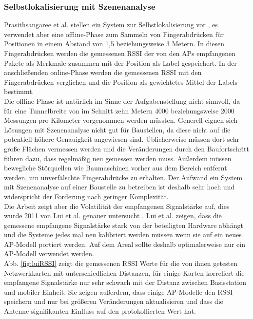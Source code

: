 \subsubsection{Selbstlokalisierung mit Szenenanalyse}
\label{ch:Vorherige:sec:RSS-basierte}
Prasithsangaree et al. stellen ein System zur Selbstlokalisierung vor \cite{prasithsangaree2002indoor}, es verwendet aber eine offline-Phase zum Sammeln von Fingerabdrücken für Positionen in einem Abstand von 1,5 beziehungsweise 3 Metern. 
In diesen Fingerabdrücken werden die gemessenen RSSI der von den APs empfangenen Pakete als Merkmale zusammen mit der Position als Label gespeichert.
In der anschließenden online-Phase werden die gemessenen RSSI mit den Fingerabdrücken verglichen und die Position als gewichtetes Mittel der Labels bestimmt. \\
Die offline-Phase ist natürlich im Sinne der Aufgabenstellung nicht sinnvoll, da für eine Tunnelbreite von im Schnitt zehn Metern 4000 beziehungsweise 2000 Messungen pro Kilometer vorgenommen werden müssten.
Generell eignen sich Lösungen mit Szenenanalyse nicht gut für Baustellen, da diese nicht auf die potentiell höhere Genauigkeit angewiesen sind. 
Üblicherweise müssen dort sehr große Flächen vermessen werden und die Veränderungen durch den Baufortschritt führen dazu, dass regelmäßig neu gemessen werden muss.
Außerdem müssen bewegliche Störquellen wie Baumaschinen vorher aus dem Bereich entfernt werden, um unverfälschte Fingerabdrücke zu erhalten.
Der Aufwand ein System mit Szenenanalyse auf einer Baustelle zu betreiben ist deshalb sehr hoch und widerspricht der Forderung nach geringer Komplexität. \\
Die Arbeit zeigt aber die Volatilität der empfangenen Signalstärke auf, dies wurde 2011 von Lui et al. genauer untersucht \cite{lui2011differences}.
Lui et al. zeigen, dass die gemessene empfangene Signalstärke stark von der beteiligten Hardware abhängt und die Systeme jedes mal neu kalibriert werden müssen wenn sie auf ein neues AP-Modell portiert werden. 
Auf dem Areal sollte deshalb optimalerweise nur ein AP-Modell verwendet werden. \\
Abb. \ref{fig:luiRSSI} zeigt die gemessenen RSSI Werte für die von ihnen getesten Netzwerkkarten mit unterschiedlichen Distanzen, für einige Karten korreliert die empfangene Signalstärke nur sehr schwach mit der Distanz zwischen Basisstation und mobiler Einheit.
Sie zeigen außerdem, dass einige AP-Modelle den RSSI speichern und nur bei größeren Veränderungen aktualisieren und dass die Antenne signifikanten Einfluss auf den protokollierten Wert hat.

